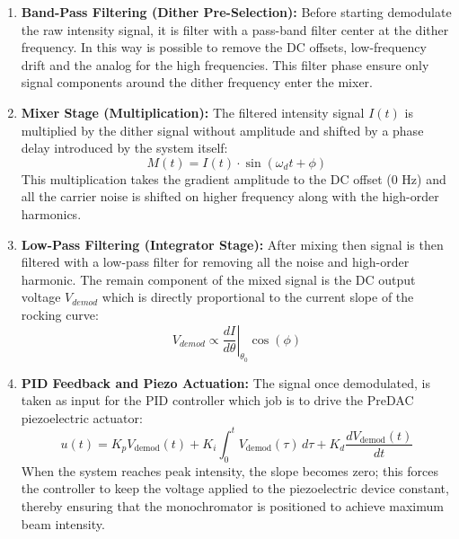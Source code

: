 \begin{enumerate}
    \item \textbf{Band-Pass Filtering (Dither Pre-Selection):} 
    Before starting demodulate the raw intensity signal, it is filter with a pass-band filter center at the dither frequency.
    In this way is possible to remove the DC offsets, low-frequency drift and the analog for the high frequencies.
    This filter phase ensure only signal components around the dither frequency enter the mixer.
    
    \item \textbf{Mixer Stage (Multiplication):} The filtered intensity signal $I(t)$ is multiplied by the dither signal without amplitude and shifted by a phase delay introduced by the system itself:
    \begin{equation}
        M(t) = I(t) \cdot \sin(\omega_d t + \phi)
    \end{equation}
    This multiplication takes the gradient amplitude to the DC offset ($0\text{ Hz}$) and all the carrier noise is shifted on higher frequency along with the high-order harmonics.

    \item \textbf{Low-Pass Filtering (Integrator Stage):} 
    After mixing then signal is then filtered with a low-pass filter for removing all the noise and high-order harmonic.
    The remain component of the mixed signal is the DC output voltage $V_{demod}$ which is directly proportional to the current slope of the rocking curve:
    \begin{equation}
        V_{demod} \propto \left.\frac{dI}{d\theta}\right|_{\theta_0} \cos(\phi)
    \end{equation}

    \item \textbf{PID Feedback and Piezo Actuation:} The signal once demodulated, is taken as input for the PID controller which job is to drive the PreDAC piezoelectric actuator:
    \begin{equation}
    u(t) = K_p V_{\mathrm{demod}}(t) + K_i \int_0^t V_{\mathrm{demod}}(\tau) \, d\tau + K_d \frac{dV_{\mathrm{demod}}(t)}{dt}
    \end{equation}
    When the system reaches peak intensity, the slope becomes zero; this forces the controller to keep the voltage applied to the piezoelectric device constant, thereby ensuring that the monochromator is positioned to achieve maximum beam intensity.
\end{enumerate}

